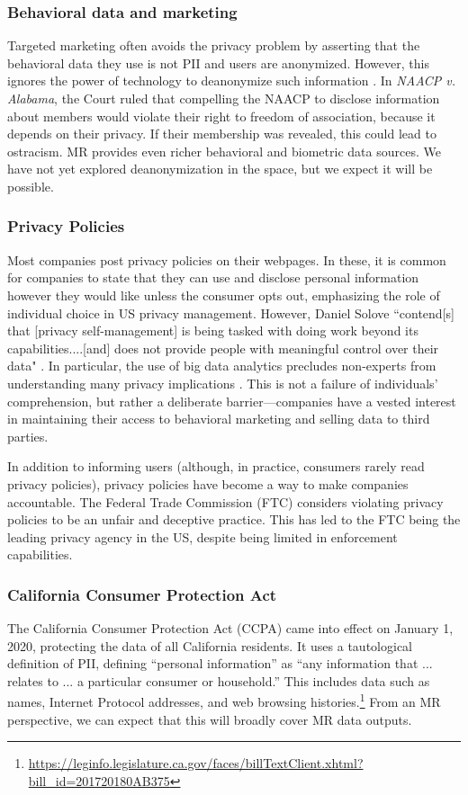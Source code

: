 \subsubsection{Behavioral data and marketing}

Targeted marketing often avoids the privacy problem by asserting that the behavioral data they use is not PII and users are anonymized. However, this ignores the power of technology to deanonymize such information \cite{narayanan2008robust}. In \emph{NAACP v. Alabama}\cite{1958naacp}, the Court ruled that compelling the NAACP to disclose information about members would violate their right to freedom of association, because it depends on their privacy. If their membership was revealed, this could lead to ostracism. MR provides even richer behavioral and biometric data sources. We have not yet explored deanonymization in the space, but we expect it will be possible.

\subsubsection{Privacy Policies}

Most companies post privacy policies on their webpages. In these, it is common for companies to state that they can use and disclose personal information however they would like unless the consumer opts out, emphasizing the role of individual choice in US privacy management. However, Daniel Solove ``contend[s] that [privacy self-management] is being tasked with doing work beyond its capabilities....[and] does not provide people with meaningful control over their data" \cite{solove2012introduction}. In particular, the use of big data analytics precludes non-experts from understanding many privacy implications \cite{baruh2017big}. This is not a failure of individuals' comprehension, but rather a deliberate barrier---companies have a vested interest in maintaining their access to behavioral marketing and selling data to third parties.

In addition to informing users (although, in practice, consumers rarely read privacy policies), privacy policies have become a way to make companies accountable. The Federal Trade Commission (FTC) considers violating privacy policies to be an unfair and deceptive practice. This has led to the FTC being the leading privacy agency in the US, despite being limited in enforcement capabilities.

\subsubsection{California Consumer Protection Act}
The California Consumer Protection Act (CCPA) came into effect on January 1, 2020, protecting the data of all California residents. It uses a tautological definition of PII, defining ``personal information'' as ``any information that ... relates to ... a particular consumer or household.'' This includes data such as names, Internet Protocol addresses, and web browsing histories.\footnote{\url{https://leginfo.legislature.ca.gov/faces/billTextClient.xhtml?bill_id=201720180AB375}}
 From an MR perspective, we can expect that this will broadly cover MR data outputs.

